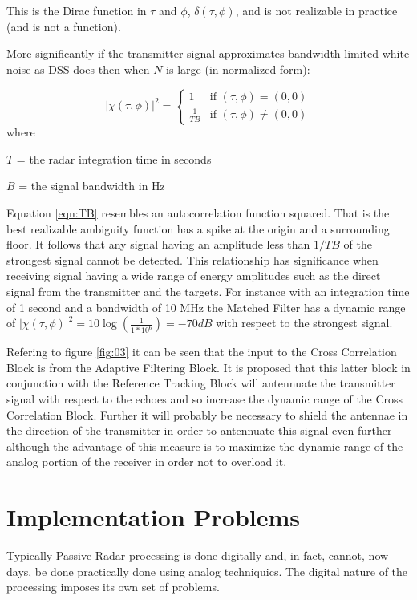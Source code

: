 \documentclass[a4paper]{report}
\numberwithin{equation}{chapter}
\begin{document}
This is the Dirac function in $\tau$ and $\phi$, $\delta(\tau, \phi)$, and is not realizable in practice (and is not a function).

\bigskip

More significantly if the transmitter signal approximates bandwidth limited white noise as DSS does then when $N$ is large (in normalized form):

\begin{equation}
|\chi(\tau, \phi)|^2 =
\begin{cases}
1 & \text{if } (\tau, \phi) = (0,0)\\
\frac{1}{TB} & \text{if } (\tau, \phi) \ne (0, 0)
\end{cases}
\label{eqn:TB}
\end{equation}
where

$T$ = the radar integration time in seconds

$B$ = the signal bandwidth in Hz

\bigskip

Equation \ref{eqn:TB} resembles an autocorrelation function squared. That is the best realizable ambiguity function has a spike at the origin and a surrounding floor. It follows that any signal having an amplitude less than $1/TB$ of the strongest signal cannot be detected. This relationship has significance when receiving signal having a wide range of energy amplitudes such as the direct signal from the transmitter and the targets. For instance with an integration time of 1 second and a bandwidth of 10 MHz the Matched Filter has a dynamic range of 
\begin{math}
|\chi(\tau, \phi)|^2 = 10 \log{\left(\frac{1}{1 * 10^6}\right)} = -70dB
\end{math}
with respect to the strongest signal.

\bigskip

Refering to figure \ref{fig:03} it can be seen that the input to the Cross Correlation Block is from the Adaptive Filtering Block. It is proposed that this latter block in conjunction with the Reference Tracking Block will antennuate the transmitter signal with respect to the echoes and so increase the dynamic range of the Cross Correlation Block. Further it will probably be necessary to shield the antennae in the direction of the transmitter in order to antennuate this signal even further although the advantage of this measure is to maximize the dynamic range of the analog portion of the receiver in order not to overload it.

\section[Implementation Problems]{Implementation Problems}
Typically Passive Radar processing is done digitally and, in fact, cannot, now days, be done practically done using analog techniquics. The digital nature of the processing imposes its own set of problems.
\end{document}
